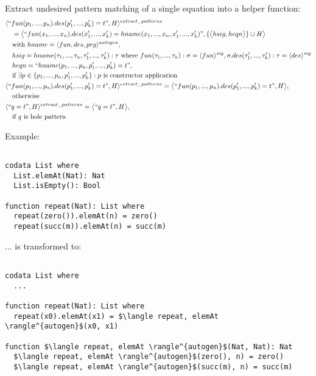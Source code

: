 \documentclass[11pt]{article} %
\begin{document}
Extract undesired pattern matching of a single equation into a helper function:
\begin{alignat*}{3}
&\langle `` fun(p_1, ..., p_n).des(p'_1, ..., p'_k) = t ", H \rangle^{extract\_patterns} \\
&\quad = \big\langle `` fun(x_1, ..., x_n).des(x'_1, ..., x'_k) = hname(x_1, ..., x_n, x'_1, ..., x'_k) ", \{\big\langle hsig, heqn \big\rangle\} \cup H \big\rangle \\
&\quad \textrm{with } hname= \langle fun, des, prg \rangle^{autogen}, \\
&\quad hsig = hname(\tau_1, ..., \tau_n, \tau'_1, ..., \tau'_k): \tau \textrm{ where } fun(\tau_1, ..., \tau_n): \sigma = \langle fun \rangle^{sig}, \sigma.des(\tau'_1, ..., \tau'_k): \tau = \langle des \rangle^{sig} \\
&\quad heqn = `` hname(p_1, ..., p_n, p'_1, ..., p'_k) = t ", \\
&\quad \textrm{if } \exists p \in \{p_1, ..., p_n, p'_1, ..., p'_k\}: p \textrm{ is constructor application} \\
&\langle `` fun(p_1, ..., p_n).des(p'_1, ..., p'_k) = t ", H \rangle^{extract\_patterns} = \big\langle `` fun(p_1, ..., p_n).des(p'_1, ..., p'_k) = t ", H \big\rangle, \\
&\quad \textrm{otherwise} \\
&\langle `` q = t ", H \rangle^{extract\_patterns} = \big\langle `` q = t ", H \big\rangle, \\
&\quad \textrm{if $q$ is hole pattern}
\end{alignat*}

Example:

\begin{lstlisting}

codata List where
  List.elemAt(Nat): Nat
  List.isEmpty(): Bool

function repeat(Nat): List where
  repeat(zero()).elemAt(n) = zero()
  repeat(succ(m)).elemAt(n) = succ(m)

\end{lstlisting}

... is transformed to:

\begin{lstlisting}[mathescape]

codata List where
  ...

function repeat(Nat): List where
  repeat(x0).elemAt(x1) = $\langle repeat, elemAt \rangle^{autogen}$(x0, x1)

function $\langle repeat, elemAt \rangle^{autogen}$(Nat, Nat): Nat
  $\langle repeat, elemAt \rangle^{autogen}$(zero(), n) = zero()
  $\langle repeat, elemAt \rangle^{autogen}$(succ(m), n) = succ(m)

\end{lstlisting}
\end{document}
